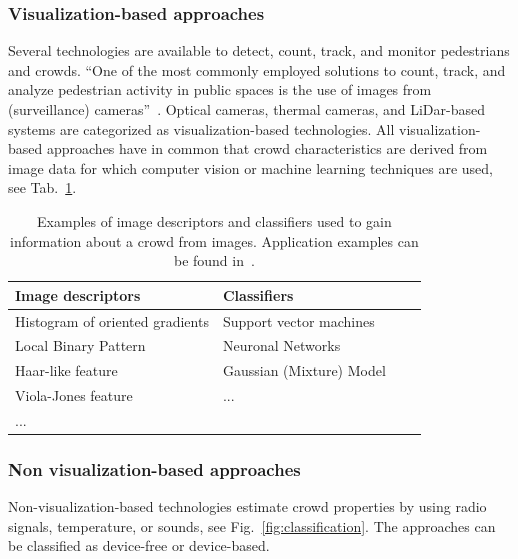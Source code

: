 \subsubsection{Visualization-based approaches}
Several technologies are available to detect, count, track, and monitor pedestrians and crowds.
\enquote{One of the most commonly employed solutions to count, track, and analyze pedestrian
activity in public spaces is the use of images from (surveillance) cameras}~\cite[p.79]{feliciani-2021-cdyn}. Optical cameras, thermal cameras, and LiDar-based systems are categorized as visualization-based technologies. All visualization-based approaches have in common that crowd characteristics are derived from image data for which computer vision or machine learning techniques are used, see Tab.~\ref{tab:verfahrenbildinfo}.
 
 
\begin{table}[hbt!]
\centering
\begin{tabular}{llll}
\hline 
Image descriptors & Classifiers \\ \hline
Histogram of oriented gradients &  Support vector machines \\ %
Local Binary Pattern  & Neuronal Networks  \\ %
Haar-like feature  & Gaussian (Mixture) Model \\ %
Viola-Jones feature & ... \\
... &  \\ %
 \hline
\end{tabular} 
\caption{Examples of image descriptors and classifiers used to gain information about a crowd from images. Application examples can be found in~\cite{brunetti-2018-cdyn}.}
\label{tab:verfahrenbildinfo}
\end{table} 




\subsubsection{Non visualization-based approaches}
Non-visualization-based technologies estimate crowd properties by using radio signals, temperature, or sounds, see Fig.~\ref{fig:classification}. The approaches can be classified as device-free or device-based.


